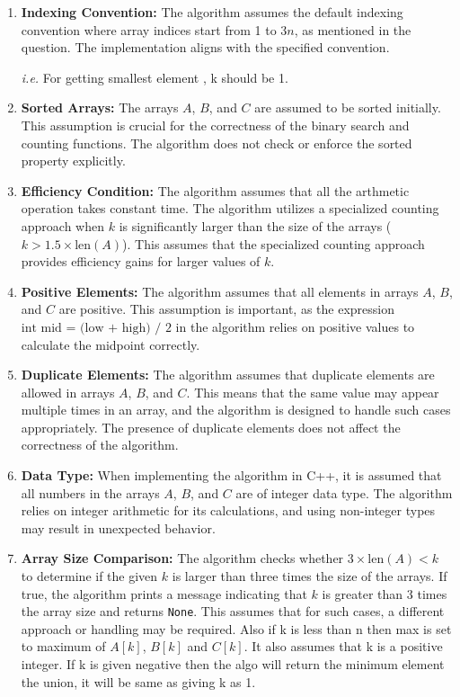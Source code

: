 \documentclass{article}
\begin{document}
\begin{enumerate}
    \item \textbf{Indexing Convention:} The algorithm assumes the default indexing convention where array indices start from 1 to \(3n\), as mentioned in the question. The implementation aligns with the specified convention. 
    
    \textit{i.e.} For getting smallest element , k should be 1.

    \item \textbf{Sorted Arrays:} The arrays \(A\), \(B\), and \(C\) are assumed to be sorted initially. This assumption is crucial for the correctness of the binary search and counting functions. The algorithm does not check or enforce the sorted property explicitly.

    \item \textbf{Efficiency Condition:} The algorithm assumes that all the arthmetic operation takes constant time. The algorithm utilizes a specialized counting approach when \(k\) is significantly larger than the size of the arrays (\(k > 1.5 \times \text{{len}}(A)\)). This assumes that the specialized counting approach provides efficiency gains for larger values of \(k\).

    \item \textbf{Positive Elements:} The algorithm assumes that all elements in arrays \(A\), \(B\), and \(C\) are positive. This assumption is important, as the expression \(\text{{int mid = (low + high) / 2}}\) in the algorithm relies on positive values to calculate the midpoint correctly.

    \item \textbf{Duplicate Elements:} The algorithm assumes that duplicate elements are allowed in arrays \(A\), \(B\), and \(C\). This means that the same value may appear multiple times in an array, and the algorithm is designed to handle such cases appropriately. The presence of duplicate elements does not affect the correctness of the algorithm.

    \item \textbf{Data Type:} When implementing the algorithm in C++, it is assumed that all numbers in the arrays \(A\), \(B\), and \(C\) are of integer data type. The algorithm relies on integer arithmetic for its calculations, and using non-integer types may result in unexpected behavior.

    \item \textbf{Array Size Comparison:} The algorithm checks whether \(3 \times \text{{len}}(A) < k\) to determine if the given \(k\) is larger than three times the size of the arrays. If true, the algorithm prints a message indicating that \(k\) is greater than 3 times the array size and returns \texttt{None}. This assumes that for such cases, a different approach or handling may be required.
    Also if k is less than n then max is set to maximum of \(A[k]\), \(B[k]\) and \(C[k]\).
    It also assumes that k is a positive integer. If k is given negative then the algo will return the minimum element the union, it will be same as giving k as 1.


\end{enumerate}
\end{document}

